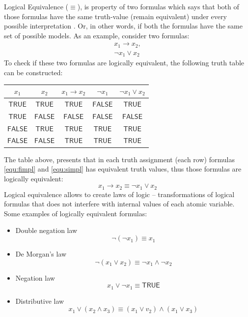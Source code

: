 \documentclass[12pt,english,pdflatex]{aghdpl}
\begin{document}
Logical Equivalence ($\equiv$), is property of two formulas which says that both of those formulas have the same truth-value (remain equivalent) under every possible interpretation \cite{ben-ari:2001}. Or, in other words, if both the formulas have the same set of possible models. As an example, consider two formulas:
\begin{gather}
x_1 \rightarrow x_2\label{equ:fimpl}, \\
\neg x_1 \vee x_2\label{equ:simpl}
\end{gather}
To check if these two formulas are logically equivalent, the following truth table can be constructed:
\begin{center}
\setlength{\tabcolsep}{6pt}
\begin{tabular}{c|c|c|c|c}
  $x_1$   &   $x_2$ & $x_1 \rightarrow x_2$ & $\neg x_1$ & $\neg x_1 \vee x_2$   \\
  \hline
  $\mathsf{TRUE}$ & $\mathsf{TRUE}$ & $\mathsf{TRUE}$ &  $\mathsf{FALSE}$ & $\mathsf{TRUE}$ \\
  $\mathsf{TRUE}$ & $\mathsf{FALSE}$ & $\mathsf{FALSE}$ &  $\mathsf{FALSE}$ & $\mathsf{FALSE}$ \\
  $\mathsf{FALSE}$ & $\mathsf{TRUE}$ & $\mathsf{TRUE}$ &  $\mathsf{TRUE}$ & $\mathsf{TRUE}$ \\
  $\mathsf{FALSE}$ & $\mathsf{FALSE}$ & $\mathsf{TRUE}$ &  $\mathsf{TRUE}$ & $\mathsf{TRUE}$
\end{tabular}
\end{center}
The table above, presents that in each truth assignment (each row) formulas \ref{equ:fimpl} and \ref{equ:simpl} has equivalent truth values, thus those formulas are logically equivalent:
\begin{equation}
\label{equ:resimpl}
x_1 \rightarrow x_2 \equiv \neg x_1 \vee x_2
\end{equation}
Logical equivalence allows to create laws of logic -- transformations of logical formulas that does not interfere with internal values of each atomic variable. Some examples of logically equivalent formulas:
\begin{itemize}
\item Double negation law
\begin{equation}
\label{equ:doublenegation}
\neg (\neg x_1) \equiv x_1
\end{equation}
\item De Morgan's law
\begin{equation}
\label{equ:demorgan}
\neg (x_1\vee x_2) \equiv \neg x_1 \wedge \neg x_2
\end{equation}
\item Negation law
\begin{equation}
x_1 \vee \neg x_1 \equiv \mathsf{TRUE}
\end{equation}
\item Distributive law
\begin{equation}
\label{equ:dist}
x_1 \vee (x_2 \wedge x_3) \equiv (x_1 \vee v_2) \wedge (x_1 \vee x_3)
\end{equation}
\end{itemize}
\end{document}
